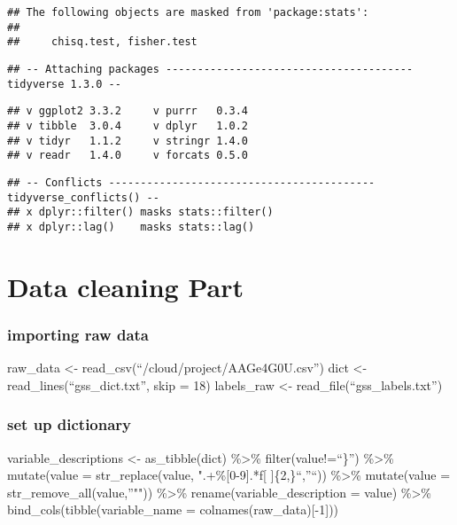 \documentclass[
]{article}
\begin{document}
\begin{verbatim}
## The following objects are masked from 'package:stats':
## 
##     chisq.test, fisher.test
\end{verbatim}

\begin{verbatim}
## -- Attaching packages --------------------------------------- tidyverse 1.3.0 --
\end{verbatim}

\begin{verbatim}
## v ggplot2 3.3.2     v purrr   0.3.4
## v tibble  3.0.4     v dplyr   1.0.2
## v tidyr   1.1.2     v stringr 1.4.0
## v readr   1.4.0     v forcats 0.5.0
\end{verbatim}

\begin{verbatim}
## -- Conflicts ------------------------------------------ tidyverse_conflicts() --
## x dplyr::filter() masks stats::filter()
## x dplyr::lag()    masks stats::lag()
\end{verbatim}

\hypertarget{data-cleaning-part}{%
\section{Data cleaning Part}\label{data-cleaning-part}}

\hypertarget{importing-raw-data}{%
\subsubsection{importing raw data}\label{importing-raw-data}}

raw\_data \textless- read\_csv(``/cloud/project/AAGe4G0U.csv'') dict
\textless- read\_lines(``gss\_dict.txt'', skip = 18) labels\_raw
\textless- read\_file(``gss\_labels.txt'')

\hypertarget{set-up-dictionary}{%
\subsubsection{set up dictionary}\label{set-up-dictionary}}

variable\_descriptions \textless- as\_tibble(dict) \%\textgreater\%
filter(value!=``\}'') \%\textgreater\% mutate(value =
str\_replace(value, ".+\%{[}0-9{]}.*f{[} {]}\{2,\}``,''``))
\%\textgreater\% mutate(value = str\_remove\_all(value,''""))
\%\textgreater\% rename(variable\_description = value) \%\textgreater\%
bind\_cols(tibble(variable\_name = colnames(raw\_data){[}-1{]}))
\end{document}
